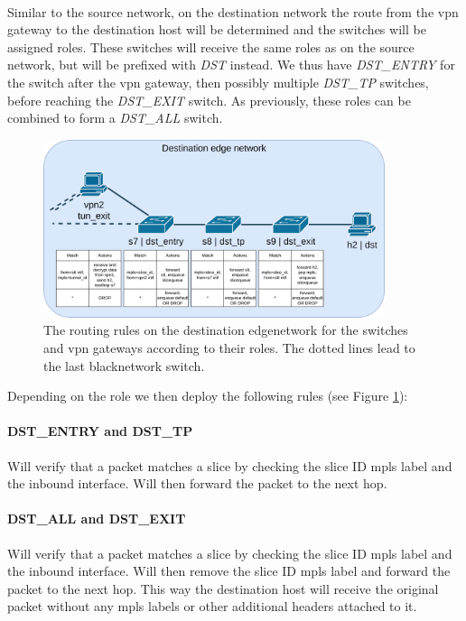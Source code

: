 \paragraph{} Similar to the source network, on the destination network the route from the \acrshort{vpn} gateway to the destination host will be determined and the switches will be assigned roles. These switches will receive the same roles as on the source network, but will be prefixed with \textit{DST} instead. We thus have \textit{DST\_ENTRY} for the switch after the \acrshort{vpn} gateway, then possibly multiple \textit{DST\_TP} switches, before reaching the \textit{DST\_EXIT} switch. As previously, these roles can be combined to form a \textit{DST\_ALL} switch.

\begin{figure}[ht]
    \centering
    \includegraphics[width=10cm]{images/chapter_6/routing_destination.png}
    \caption[Routing on the destination \gls{edgenetwork}]{The routing rules on the destination \gls{edgenetwork} for the switches and \acrshort{vpn} gateways according to their roles. The dotted lines lead to the last \gls{blacknetwork} switch.}
    \label{fig:routing_destination}
\end{figure}

Depending on the role we then deploy the following rules (see Figure \ref{fig:routing_destination}):

\paragraph{DST\_ENTRY and DST\_TP} Will verify that a packet matches a slice by checking the slice ID \acrshort{mpls} label and the inbound interface. Will then forward the packet to the next hop.

\paragraph{DST\_ALL and DST\_EXIT} Will verify that a packet matches a slice by checking the slice ID \acrshort{mpls} label and the inbound interface. Will then remove the slice ID \acrshort{mpls} label and forward the packet to the next hop. This way the destination host will receive the original packet without any \acrshort{mpls} labels or other additional headers attached to it.

